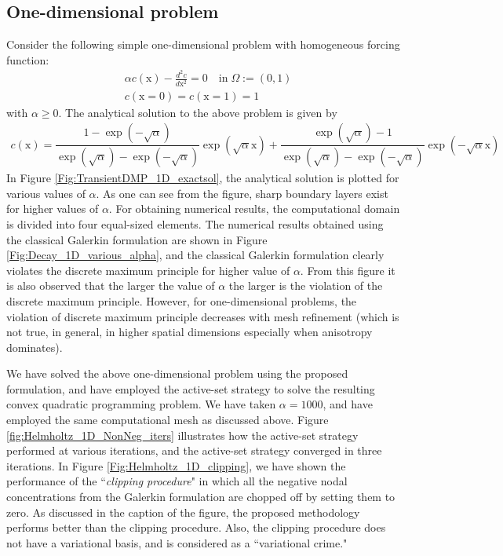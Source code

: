 \documentclass[11pt]{amsart}
\begin{document}
\subsection{One-dimensional problem}
Consider the following simple one-dimensional problem with homogeneous forcing function: 
\begin{subequations}
  \label{Eqn:Transient_1D_Helmholtz}
  \begin{align}
    &\alpha c(\mathrm{x}) - \frac{d^2 c}{d \mathrm{x}^2}  =  0 
    \quad \mathrm{in} \; \Omega := (0,1) \\
    & c(\mathrm{x}=0) = c(\mathrm{x}=1) = 1
  \end{align}
\end{subequations}
with $\alpha \geq 0$. The analytical solution to the above problem is given by 
\begin{align}
  c(\mathrm{x}) = \dfrac{1-\exp(-\sqrt{\alpha} )}{\exp(\sqrt{\alpha} )-\exp(-\sqrt{\alpha})}
  \exp(\sqrt{\alpha} \mathrm{x}) + \dfrac{\exp(\sqrt{\alpha} )-1}{\exp(\sqrt{\alpha} ) - 
    \exp(-\sqrt{\alpha} )}\exp(-\sqrt{\alpha} \mathrm{x}) 
\end{align}
In Figure \ref{Fig:TransientDMP_1D_exactsol}, the analytical solution is plotted for various 
values of $\alpha$. As one can see from the figure, sharp boundary layers exist for higher 
values of $\alpha$. For obtaining numerical results, the computational domain is divided 
into four equal-sized elements. The numerical results obtained using the classical Galerkin 
formulation are shown in Figure \ref{Fig:Decay_1D_various_alpha}, and the classical Galerkin 
formulation clearly violates the discrete maximum principle for higher value of $\alpha$. 
From this figure it is also observed that the larger the value of $\alpha$ the larger is 
the violation of the discrete maximum principle. However, for one-dimensional problems, 
the violation of discrete maximum principle decreases with mesh refinement (which is not 
true, in general, in higher spatial dimensions especially when anisotropy dominates).  

We have solved the above one-dimensional problem using the proposed formulation, and have 
employed the active-set strategy to solve the resulting convex quadratic programming problem. 
We have taken $\alpha = 1000$, and have employed the same computational mesh as discussed 
above. Figure \ref{fig:Helmholtz_1D_NonNeg_iters} illustrates how the active-set strategy 
performed at various iterations, and the active-set strategy converged in three iterations. 
In Figure \ref{Fig:Helmholtz_1D_clipping}, we have shown the performance of the ``\emph{clipping 
procedure}" in which all the negative nodal concentrations from the Galerkin formulation 
are chopped off by setting them to zero. As discussed in the caption of the figure, the 
proposed methodology performs better than the clipping procedure. Also, the clipping 
procedure does not have a variational basis, and is considered as a ``variational crime."
\end{document}
